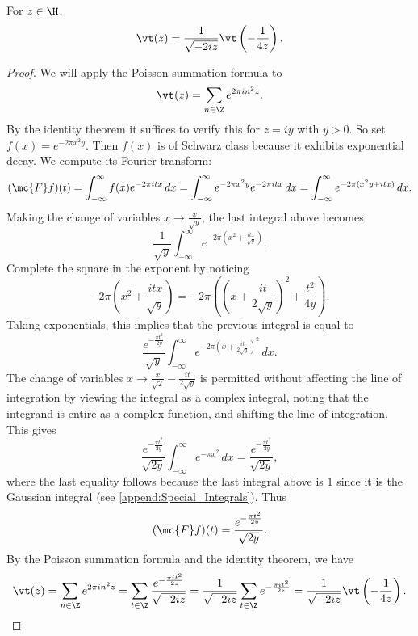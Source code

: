       \begin{theorem}\label{thm:functional_equation_Jacobi_theta}
        For $z \in \H$,
        \[
          \vt(z) = \frac{1}{\sqrt{-2iz}}\vt\left(-\frac{1}{4z}\right).
        \]
      \end{theorem}
      \begin{proof}
        We will apply the Poisson summation formula to
        \[
          \vt(z) = \sum_{n \in \Z}e^{2\pi in^{2}z}.
        \]
        By the identity theorem it suffices to verify this for $z = iy$ with $y > 0$. So set $f(x) = e^{-2\pi x^{2}y}$. Then $f(x)$ is of Schwarz class because it exhibits exponential decay. We compute its Fourier transform:
        \[
          (\mc{F}f)(t) = \int_{-\infty}^{\infty}f(x)e^{-2\pi itx}\,dx = \int_{-\infty}^{\infty}e^{-2\pi x^{2}y}e^{-2\pi itx}\,dx = \int_{-\infty}^{\infty}e^{-2\pi(x^{2}y+itx)}\,dx.
        \]
        Making the change of variables $x \to \frac{x}{\sqrt{y}}$, the last integral above becomes
        \[
          \frac{1}{\sqrt{y}}\int_{-\infty}^{\infty}e^{-2\pi\left(x^{2}+\frac{itx}{\sqrt{y}}\right)}.
        \]
        Complete the square in the exponent by noticing
        \[
          -2\pi\left(x^{2}+\frac{itx}{\sqrt{y}}\right) = -2\pi\left(\left(x+\frac{it}{2\sqrt{y}}\right)^{2}+\frac{t^{2}}{4y}\right).
        \]
        Taking exponentials, this implies that the previous integral is equal to
        \[
          \frac{e^{-\frac{\pi t^{2}}{2y}}}{\sqrt{y}}\int_{-\infty}^{\infty}e^{-2\pi\left(x+\frac{it}{2\sqrt{y}}\right)^{2}}\,dx.
        \]
        The change of variables $x \to \frac{x}{\sqrt{2}}-\frac{it}{2\sqrt{y}}$ is permitted without affecting the line of integration by viewing the integral as a complex integral, noting that the integrand is entire as a complex function, and shifting the line of integration. This gives
        \[
          \frac{e^{-\frac{\pi t^{2}}{2y}}}{\sqrt{2y}}\int_{-\infty}^{\infty}e^{-\pi x^{2}}\,dx = \frac{e^{-\frac{\pi t^{2}}{2y}}}{\sqrt{2y}},
        \]
        where the last equality follows because the last integral above is $1$ since it is the Gaussian integral (see \cref{append:Special_Integrals}). Thus
        \[
          (\mc{F}f)(t) = \frac{e^{-\frac{\pi t^{2}}{2y}}}{\sqrt{2y}}.
        \]
        By the Poisson summation formula and the identity theorem, we have
        \[
          \vt(z) = \sum_{n \in \Z}e^{2\pi in^{2}z} = \sum_{t \in \Z}\frac{e^{-\frac{\pi it^{2}}{2z}}}{\sqrt{-2iz}} = \frac{1}{\sqrt{-2iz}}\sum_{t \in \Z}e^{-\frac{\pi it^{2}}{2z}} = \frac{1}{\sqrt{-2iz}}\vt\left(-\frac{1}{4z}\right).
        \]
      \end{proof}

